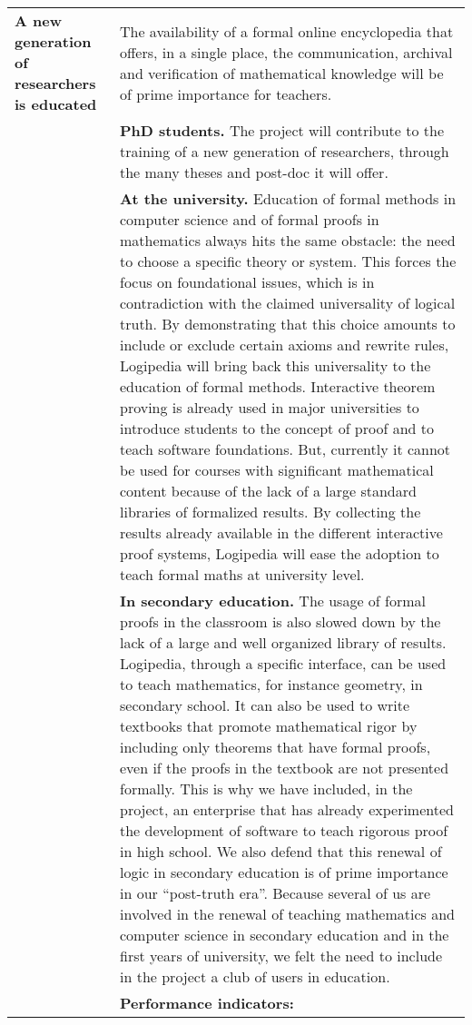 \begin{longtable}{|p{}|p{}|}
\hline
{\bf A new generation of researchers is educated}
&
The availability of a formal online encyclopedia that offers, in a
single place, the communication, archival and verification of
mathematical knowledge will be of prime importance for teachers.\\
&
{\bf PhD students.} The project will contribute to the training of a new
generation of researchers, through the many theses and post-doc it will
offer.\\
&
{\bf At the university.}
Education of formal methods in computer science and of formal proofs
in mathematics always hits the same obstacle: the need to choose a
specific theory or system. This forces the focus on foundational issues,
which is in contradiction with the claimed universality of logical truth.
By demonstrating that this choice amounts to include or exclude 
certain axioms and rewrite rules, Logipedia will bring back this
universality to the education of formal methods.  Interactive
theorem proving is already used in major universities to introduce
students to the concept of proof and to teach software foundations.
But, currently it cannot be used for courses with significant
mathematical content because of the lack of a large standard libraries
of formalized results.  By collecting the results already available in
the different interactive proof systems, Logipedia will ease the
adoption to teach formal maths at university level.
\\
&
{\bf In secondary education.}
The usage of formal proofs in the classroom is also slowed down by the
lack of a large and well organized library of results.  Logipedia,
through a specific interface, can be used to teach mathematics, for
instance geometry, in secondary school.  It can also be used to write
textbooks that promote mathematical rigor by including only
theorems that have formal proofs, even if the proofs in the textbook
are not presented formally.
This is why we have included, in the project, an enterprise that has
already experimented the development of software to teach rigorous proof
in high school.
We also defend that this renewal of logic in secondary education
is of prime importance in our ``post-truth era''.
Because several of us are involved in the renewal of teaching
mathematics and computer science in secondary education and in the
first years of university, we felt the need to include in the project
a club of users in education.
\\
&
\colorbox{color2}{\bf Performance indicators:}

\end{longtable}
